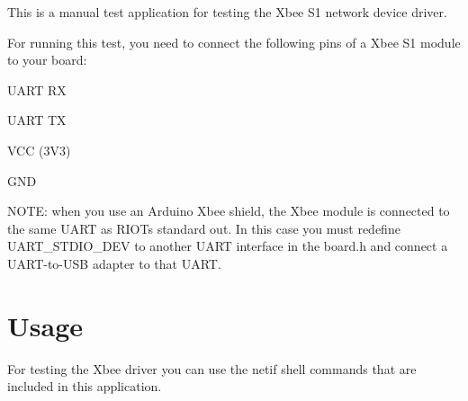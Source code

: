 This is a manual test application for testing the Xbee S1 network device driver.

For running this test, you need to connect the following pins of a Xbee S1 module to your board\+:
\begin{DoxyItemize}
\item U\+A\+RT RX
\item U\+A\+RT TX
\item V\+CC (3\+V3)
\item G\+ND
\end{DoxyItemize}

N\+O\+TE\+: when you use an Arduino Xbee shield, the Xbee module is connected to the same U\+A\+RT as R\+I\+O\+Ts standard out. In this case you must redefine U\+A\+R\+T\+\_\+\+S\+T\+D\+I\+O\+\_\+\+D\+EV to another U\+A\+RT interface in the board.\+h and connect a U\+A\+R\+T-\/to-\/\+U\+SB adapter to that U\+A\+RT.

\section*{Usage}

For testing the Xbee driver you can use the netif shell commands that are included in this application. 